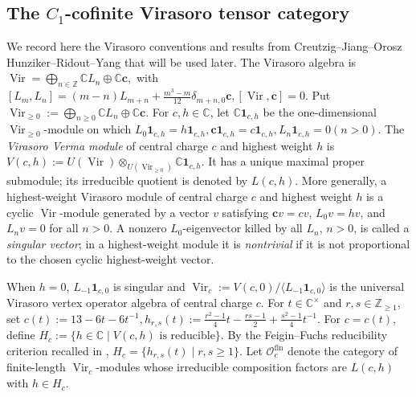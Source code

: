 \documentclass[12pt,leqno]{amsart}
\numberwithin{equation}{section} \newtheorem{thm}{Theorem}[section] \newtheorem{lem}[thm]{Lemma} \newtheorem{ex}[thm]{Example} \newtheorem{prop}[thm]{Proposition} \newtheorem{cor}[thm]{Corollary} \newtheorem{defi}[thm]{Definition} \newtheorem{rmk}[thm]{Remark} \newtheorem{notation}[thm]{Notation}
\newcommand{\one}{\mathbf{1}}
\newcommand{\Vir}{\operatorname{Vir}}
\def\Z{\mathbb{Z}} \def\N{\mathbb{N}} \def\A{\mathbb{A}} \def\C{\mathbb{C}} \def\R{\mathbb{R}} \def\Q{\mathbb{Q}} \def\F{\mathbb{F}}
\begin{document}
\subsection{The \texorpdfstring{$C_1$}{C1}-cofinite Virasoro tensor category}
\label{subsec:CJORY-package}

We record here the Virasoro conventions and results from Creutzig--Jiang--Orosz Hunziker--Ridout--Yang \cite[Section~2.2]{CJORY} that will be used later. The Virasoro algebra is \(\Vir=\bigoplus_{n\in\Z}\C L_n\oplus\C\mathbf c,\) with \([L_m,L_n]=(m-n)L_{m+n}+\frac{m^3-m}{12}\delta_{m+n,0}\mathbf c,[\Vir,\mathbf c]=0.\) Put \(\Vir_{\ge0}:=\bigoplus_{n\ge0}\C L_n\oplus\C\mathbf c\). For $c,h\in\C$, let $\C\one_{c,h}$ be the one-dimensional $\Vir_{\ge0}$-module on which \(L_0\one_{c,h}=h\one_{c,h},\mathbf c\one_{c,h}=c\one_{c,h},L_n\one_{c,h}=0(n>0).\) The \emph{Virasoro Verma module} of central charge $c$ and highest weight $h$ is \(V(c,h):=U(\Vir)\otimes_{U(\Vir_{\ge0})}\C\one_{c,h}.\) It has a unique maximal proper submodule; its irreducible quotient is denoted by $L(c,h)$. More generally, a highest-weight Virasoro module of central charge $c$ and highest weight $h$ is a cyclic $\Vir$-module generated by a vector $v$ satisfying \(\mathbf c v=cv\), \(L_0v=hv\), and \(L_nv=0\) for all $n>0$. A nonzero $L_0$-eigenvector killed by all $L_n$, $n>0$, is called a \emph{singular vector}; in a highest-weight module it is \emph{nontrivial} if it is not proportional to the chosen cyclic highest-weight vector.

When $h=0$, $L_{-1}\one_{c,0}$ is singular and \(\Vir_c:=V(c,0)/\langle L_{-1}\one_{c,0}\rangle\) is the universal Virasoro vertex operator algebra of central charge $c$. For $t\in\C^\times$ and $r,s\in\Z_{\ge1}$, set \(c(t):=13-6t-6t^{-1},h_{r,s}(t):=\frac{r^2-1}{4}t-\frac{rs-1}{2}+\frac{s^2-1}{4}t^{-1}.\) For $c=c(t)$, define \(H_c:=\{h\in\C\mid V(c,h)\text{ is reducible}\}.\) By the Feigin--Fuchs reducibility criterion recalled in \cite[Section~2.2]{CJORY}, \(H_c=\{h_{r,s}(t)\mid r,s\ge1\}\). Let $\mathcal O_c^{\mathrm{fin}}$ denote the category of finite-length $\Vir_c$-modules whose irreducible composition factors are $L(c,h)$ with $h\in H_c$.
\end{document}
